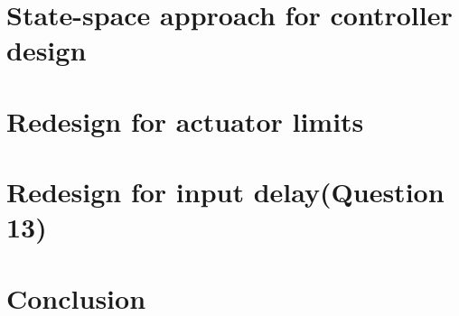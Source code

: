 \documentclass{article}
\begin{document}
\section{State-space approach for controller design}
\label{sec:ss}

\clearpage

\section{Redesign for actuator limits}
\label{sec:retune}

\clearpage

\section{Redesign for input delay\textnormal{\phantom{xxx}(Question 13)}}
\label{sec:delay}

\clearpage

\section*{Conclusion}

\clearpage

\printbibliography
\cleardoublepage

\end{document}
